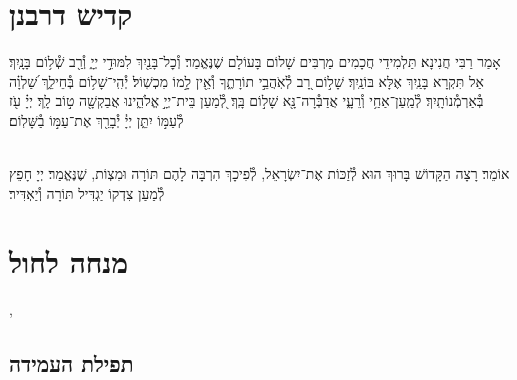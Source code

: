 \documentclass[twoside, openany, parskip=half, 11pt]{book}
\begin{document}
\tachanunim

\vfill


\sepline


\chapter[קדיש דרבנן]{ קדיש דרבנן }
\label{kaddish derabonan}


אָמַר רַבִּי חֲנִינָא׃ תַּלְמִידֵי חֲכָמִים מַרְבִּים שָׁלוֹם בָּעוֹלָם שֶׁנֶּאֱמַר׃ וְ֯כׇל־בָּנַ֖יִךְ לִמּוּדֵ֣י יְיָ֑ וְ֯רַ֖ב שְׁ֯ל֥וֹם בָּנָֽיִךְ׃ אַל תִּקְרָא בָּנַֽיִךְ אֶלָּא בּוֹנַֽיִךְ׃ שָׁל֣וֹם רָ֭ב לְ֯אֹֽהֲבֵ֣י תוֹרָתֶ֑ךָ וְ֯אֵ֖ין לָ֣מוֹ מִכְשֽׁוֹל׃ יְ֯הִֽי־שָׁל֥וֹם בְּ֯חֵילֵ֑ךְ שַׁ֝לְוָ֗ה בְּ֯אַרְמְ֯נוֹתָֽיִךְ׃ לְ֯מַֽעַן־אַחַ֥י וְ֯רֵעָ֑י אֲדַבְּ֯רָה־נָּ֖א שָׁל֣וֹם בָּֽךְ׃ לְ֭֯מַעַן בֵּית־יְיָ֣ אֱלֹהֵ֑ינוּ אֲבַקְשָׁ֖ה ט֣וֹב לָֽךְ׃ יְיָ֗ עֹ֖ז לְ֯עַמּ֣וֹ יִתֵּ֑ן יְיָ֓ יְ֯בָרֵ֖ךְ אֶת־עַמּ֣וֹ בַ֯שָּׁלֽוֹם׃

\\
אוֹמֵר׃ רָצָה הַקָּדוֹשׁ בָּרוּךְ הוּא לְ֯זַכּוֹת אֶת־יִשְׂרָאֵל, לְ֯פִיכָךְ הִרְבָּה לָהֶם תּוֹרָה וּמִצְוֹת, שֶׁנֶּאֱמַר׃
יְיָ חָפֵץ לְ֯מַעַן צִדְקוֹ יַגְדִּיל תּוֹרָה וְ֯יַאְדִּיר׃


\begin{kaddish}

\rabbiskaddish
\end{kaddish}

\vfill
\sepline

\chapter[מנחה לחול]{ מנחה לחול }
\tamid

\ketoret
\sepline
\ashrei

\halfkaddish

,


\section*{ תפילת העמידה }
\end{document}
